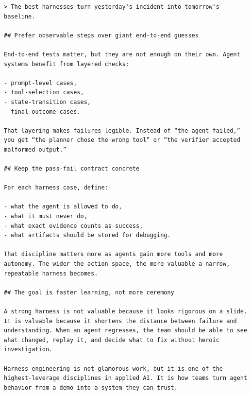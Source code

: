 \documentclass[aspectratio=169]{beamer}
\begin{document}
\begin{frame}[fragile]
\begin{verbatim}
> The best harnesses turn yesterday's incident into tomorrow's baseline.

## Prefer observable steps over giant end-to-end guesses

End-to-end tests matter, but they are not enough on their own. Agent systems benefit from layered checks:

- prompt-level cases,
- tool-selection cases,
- state-transition cases,
- final outcome cases.

That layering makes failures legible. Instead of “the agent failed,” you get “the planner chose the wrong tool” or “the verifier accepted malformed output.”

## Keep the pass-fail contract concrete

For each harness case, define:

- what the agent is allowed to do,
- what it must never do,
- what exact evidence counts as success,
- what artifacts should be stored for debugging.

That discipline matters more as agents gain more tools and more autonomy. The wider the action space, the more valuable a narrow, repeatable harness becomes.

## The goal is faster learning, not more ceremony

A strong harness is not valuable because it looks rigorous on a slide. It is valuable because it shortens the distance between failure and understanding. When an agent regresses, the team should be able to see what changed, replay it, and decide what to fix without heroic investigation.

Harness engineering is not glamorous work, but it is one of the highest-leverage disciplines in applied AI. It is how teams turn agent behavior from a demo into a system they can trust.
\end{verbatim}
\end{frame}
\end{document}
